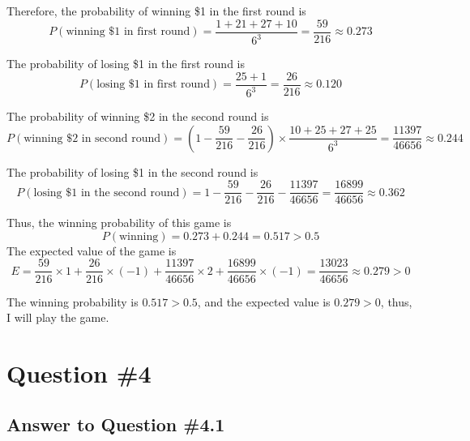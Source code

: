 \documentclass[conference]{styles/acmsiggraph}
\begin{document}
Therefore, the probability of winning \$1 in the first round is
\begin{equation}
	P(\text{winning \$1 in first round}) = \frac{1+21+27+10}{6^3} = \frac{59}{216} \approx 0.273
\end{equation}

The probability of losing \$1 in the first round is
\begin{equation}
	P(\text{losing \$1 in first round}) = \frac{25+1}{6^3} = \frac{26}{216} \approx 0.120
\end{equation}


The probability of winning \$2 in the second round is
\begin{equation} 
	P(\text{winning \$2 in second round}) = (1- \frac{59}{216} - \frac{26}{216}) \times \frac{10+25+27+25}{6^3} = \frac{11397}{46656} \approx 0.244
\end{equation}

The probability of losing \$1 in the second round is
\begin{equation} 
	P(\text{losing \$1 in the second round}) = 1- \frac{59}{216} - \frac{26}{216}- \frac{11397}{46656} = \frac{16899}{46656}  \approx 0.362
\end{equation}

Thus, the winning probability of this game is
\begin{equation}
	P(\text{winning}) = 0.273+0.244 = 0.517 > 0.5
\end{equation}
The expected value of the game is
\begin{equation}
	E = \frac{59}{216} \times 1 + \frac{26}{216} \times (-1) + \frac{11397}{46656} \times 2 + \frac{16899}{46656} \times (-1) =  \frac{13023}{46656} \approx 0.279 > 0 
\end{equation}

The winning probability is $0.517 > 0.5$, and the expected value is $0.279 > 0$, thus, I will play the game.

\section{Question \#4}

\subsection{Answer to Question \#4.1}
\end{document}
